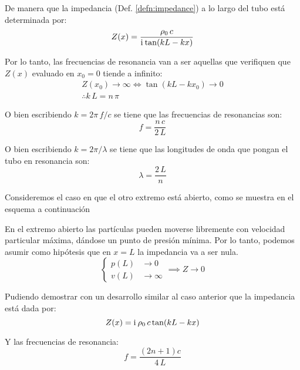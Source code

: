 \documentclass[a5paper,12pt,twoside]{book}
\begin{document}
De manera que la impedancia (Def. \ref{defn:impedance}) a lo largo del tubo está determinada por:
\begin{equation}
    Z(x) = \frac{\rho_0 \, c}{\mathrm{i}\mkern1mu \tan(kL-kx)}
\end{equation}

Por lo tanto, las frecuencias de resonancia van a ser aquellas que verifiquen que $Z(x)$ evaluado en $x_0=0$ tiende a infinito:
\begin{gather*}
    Z(x_0) \to \infty
    \iff
    \tan(kL-kx_0) \to 0
    \\
    \therefore
    k\,L = n\,\pi
\end{gather*}

O bien escribiendo $k=2\pi\, f/c$ se tiene que las frecuencias de resonancias son:
\begin{equation}
    f = \frac{n \, c}{2 \, L}
\end{equation}

O bien escribiendo $k=2\pi/\lambda$ se tiene que las longitudes de onda que pongan el tubo en resonancia son:
\begin{equation}
    \lambda = \frac{2 \, L}{n}
\end{equation}

Consideremos el caso en que el otro extremo está abierto, como se muestra en el esquema a continuación

\begin{center}
    \def\svgwidth{0.6\linewidth}
    
\end{center}

En el extremo abierto las partículas pueden moverse libremente con velocidad particular máxima, dándose un punto de presión mínima.
Por lo tanto, podemos asumir como hipótesis que en $x=L$ la impedancia va a ser nula.
\begin{equation*}
    \left\{
    \begin{aligned}
        p(L) &\to 0
        \\
        v(L) &\to \infty
    \end{aligned}
    \right.
    \implies
    Z \to 0
\end{equation*}

Pudiendo demostrar con un desarrollo similar al caso anterior que la impedancia está dada por:
\begin{equation}
    Z(x) = \mathrm{i}\mkern1mu \, \rho_0 \, c \tan (kL-kx)
\end{equation}

Y las frecuencias de resonancia:
\begin{equation}
    f = \frac{\left( 2n+1 \right) c}{4 \, L}
\end{equation}
\end{document}

